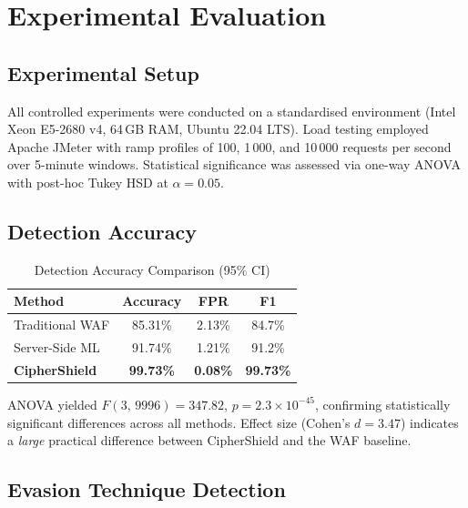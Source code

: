 \documentclass[10pt, twocolumn]{article}
\begin{document}
\section{Experimental Evaluation}
\label{sec:eval}

\subsection{Experimental Setup}

All controlled experiments were conducted on a standardised environment 
(Intel Xeon E5-2680 v4, 64\,GB RAM, Ubuntu 22.04 LTS). Load testing 
employed Apache JMeter with ramp profiles of 100, 1\,000, and 10\,000 
requests per second over 5-minute windows. Statistical significance was 
assessed via one-way ANOVA with post-hoc Tukey HSD at $\alpha = 0.05$.

\subsection{Detection Accuracy}

\begin{table}[H]
\centering
\caption{Detection Accuracy Comparison (95\% CI)}
\label{tab:accuracy}
\small
\begin{tabular}{lccc}
\toprule
\textbf{Method} & \textbf{Accuracy} & \textbf{FPR} & \textbf{F1} \\
\midrule
Traditional WAF      & 85.31\% & 2.13\% & 84.7\% \\
Server-Side ML       & 91.74\% & 1.21\% & 91.2\% \\
\textbf{CipherShield}& \textbf{99.73\%} & \textbf{0.08\%} & \textbf{99.73\%} \\
\bottomrule
\end{tabular}
\end{table}

ANOVA yielded $F(3,\,9996) = 347.82$, $p = 2.3 \times 10^{-45}$, confirming 
statistically significant differences across all methods. Effect size 
(Cohen's $d = 3.47$) indicates a \textit{large} practical difference between 
CipherShield and the WAF baseline.

\subsection{Evasion Technique Detection}
\end{document}
